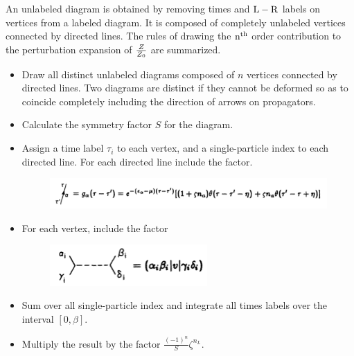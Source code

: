 \documentclass[12pt]{article}
\begin{document}
An unlabeled diagram is obtained by removing times and $\rm L-R$ labels on vertices 
from a labeled diagram. It is composed of completely unlabeled vertices connected by 
directed lines. The rules of drawing the $\rm n^{th}$ order contribution to the 
perturbation expansion of $\tiny \frac{Z}{Z_0}$ are summarized.
\begin{itemize}
    \item Draw all distinct unlabeled diagrams composed of $n$ vertices connected by 
    directed lines. Two diagrams are distinct if they cannot be deformed so as to 
    coincide completely including the direction of arrows on propagators.
    \item Calculate the symmetry factor $S$ for the diagram.
    \item Assign a time label $\tau_i$ to each vertex, and a single-particle index 
    to each directed line. For each directed line include the factor.
    \begin{figure}[H]
        \centering
        \includegraphics[width=15cm]{p3.png}
        \caption*{}
        \label{}
    \end{figure}
    \item For each vertex, include the factor
    \begin{figure}[H]
        \centering
        \includegraphics[width=6cm]{p1.png}
        \caption*{}
        \label{}
    \end{figure} 
    \item Sum over all single-particle index and integrate all times labels over the 
    interval $[0,\beta]$.
    \item Multiply the result by the factor $\frac{(-1)^n}{S}\zeta^{n_L}$. 
\end{itemize}
\end{document}
